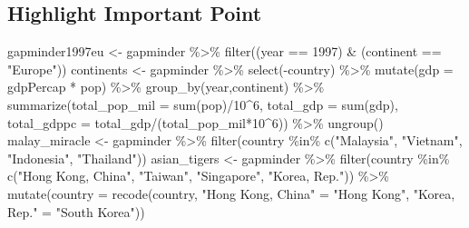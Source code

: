 \documentclass[
  letterpaper,
]{book}
\newenvironment{Shaded}{\begin{snugshade}}{\end{snugshade}}
\newcommand{\AttributeTok}[1]{\textcolor[rgb]{0.40,0.45,0.13}{#1}}
\newcommand{\DecValTok}[1]{\textcolor[rgb]{0.68,0.00,0.00}{#1}}
\newcommand{\FunctionTok}[1]{\textcolor[rgb]{0.28,0.35,0.67}{#1}}
\newcommand{\NormalTok}[1]{\textcolor[rgb]{0.00,0.23,0.31}{#1}}
\newcommand{\OtherTok}[1]{\textcolor[rgb]{0.00,0.23,0.31}{#1}}
\newcommand{\SpecialCharTok}[1]{\textcolor[rgb]{0.37,0.37,0.37}{#1}}
\newcommand{\StringTok}[1]{\textcolor[rgb]{0.13,0.47,0.30}{#1}}
\begin{document}
\hypertarget{highlight-important-point}{%
\subsection{Highlight Important Point}\label{highlight-important-point}}

\begin{Shaded}
\begin{Highlighting}[]
\NormalTok{gapminder1997eu }\OtherTok{\textless{}{-}}\NormalTok{ gapminder }\SpecialCharTok{\%\textgreater{}\%} \FunctionTok{filter}\NormalTok{((year }\SpecialCharTok{==} \DecValTok{1997}\NormalTok{) }\SpecialCharTok{\&}\NormalTok{ (continent }\SpecialCharTok{==} \StringTok{"Europe"}\NormalTok{))}
\NormalTok{continents }\OtherTok{\textless{}{-}}\NormalTok{ gapminder }\SpecialCharTok{\%\textgreater{}\%} \FunctionTok{select}\NormalTok{(}\SpecialCharTok{{-}}\NormalTok{country) }\SpecialCharTok{\%\textgreater{}\%} \FunctionTok{mutate}\NormalTok{(}\AttributeTok{gdp =}\NormalTok{ gdpPercap }\SpecialCharTok{*}\NormalTok{ pop) }\SpecialCharTok{\%\textgreater{}\%} \FunctionTok{group\_by}\NormalTok{(year,continent) }\SpecialCharTok{\%\textgreater{}\%} \FunctionTok{summarize}\NormalTok{(}\AttributeTok{total\_pop\_mil =} \FunctionTok{sum}\NormalTok{(pop)}\SpecialCharTok{/}\DecValTok{10}\SpecialCharTok{\^{}}\DecValTok{6}\NormalTok{, }\AttributeTok{total\_gdp =} \FunctionTok{sum}\NormalTok{(gdp), }\AttributeTok{total\_gdppc =}\NormalTok{ total\_gdp}\SpecialCharTok{/}\NormalTok{(total\_pop\_mil}\SpecialCharTok{*}\DecValTok{10}\SpecialCharTok{\^{}}\DecValTok{6}\NormalTok{)) }\SpecialCharTok{\%\textgreater{}\%} \FunctionTok{ungroup}\NormalTok{()}
\NormalTok{malay\_miracle }\OtherTok{\textless{}{-}}\NormalTok{ gapminder }\SpecialCharTok{\%\textgreater{}\%} \FunctionTok{filter}\NormalTok{(country }\SpecialCharTok{\%in\%} \FunctionTok{c}\NormalTok{(}\StringTok{"Malaysia"}\NormalTok{, }\StringTok{"Vietnam"}\NormalTok{, }\StringTok{"Indonesia"}\NormalTok{, }\StringTok{"Thailand"}\NormalTok{))}
\NormalTok{asian\_tigers }\OtherTok{\textless{}{-}}\NormalTok{ gapminder }\SpecialCharTok{\%\textgreater{}\%} \FunctionTok{filter}\NormalTok{(country }\SpecialCharTok{\%in\%} \FunctionTok{c}\NormalTok{(}\StringTok{"Hong Kong, China"}\NormalTok{, }\StringTok{"Taiwan"}\NormalTok{, }\StringTok{"Singapore"}\NormalTok{, }\StringTok{"Korea, Rep."}\NormalTok{)) }\SpecialCharTok{\%\textgreater{}\%}
  \FunctionTok{mutate}\NormalTok{(}\AttributeTok{country =} \FunctionTok{recode}\NormalTok{(country,  }\StringTok{"Hong Kong, China"} \OtherTok{=} \StringTok{"Hong Kong"}\NormalTok{,  }\StringTok{"Korea, Rep."} \OtherTok{=} \StringTok{"South Korea"}\NormalTok{)) }
\end{Highlighting}
\end{Shaded}
\end{document}
